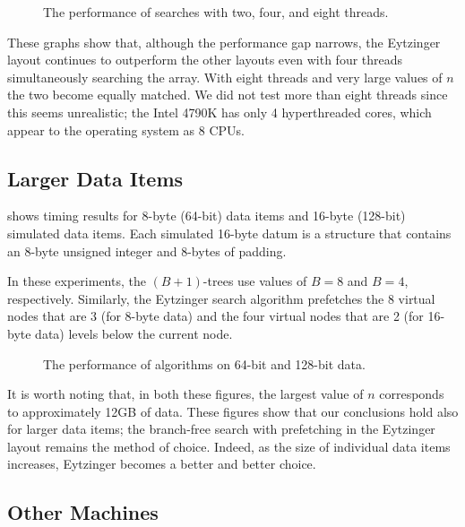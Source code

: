 \documentclass{patmorin}
\begin{document}
\begin{figure}
   \caption{The performance of searches with two, four, and eight threads.}
\end{figure}

These graphs show that, although the performance gap narrows, the
Eytzinger layout continues to outperform the other layouts even with four
threads simultaneously searching the array.  With eight threads and very
large values of $n$ the two become equally matched.  We did not test more
than eight threads since this seems unrealistic; the Intel 4790K has only
4 hyperthreaded cores, which appear to the operating system as 8 CPUs.


\subsection{Larger Data Items}

 shows timing results for 8-byte (64-bit) data items and
16-byte (128-bit) simulated data items.  Each simulated 16-byte datum is a
structure that contains an 8-byte unsigned integer and 8-bytes of padding.

In these experiments, the $(B+1)$-trees use values of $B=8$ and $B=4$,
respectively. Similarly, the Eytzinger search algorithm prefetches the
8 virtual nodes that are 3 (for 8-byte data) and the four virtual nodes
that are 2 (for 16-byte data) levels below the current node.

\begin{figure}
   \caption{The performance of algorithms on 64-bit and 128-bit data.}
\end{figure}

It is worth noting that, in both these figures, the largest value of
$n$ corresponds to approximately 12GB of data. These figures show that
our conclusions hold also for larger data items; the branch-free search
with prefetching in the Eytzinger layout remains the method of choice.
Indeed, as the size of individual data items increases, Eytzinger becomes
a better and better choice.

\subsection{Other Machines}
\end{document}
